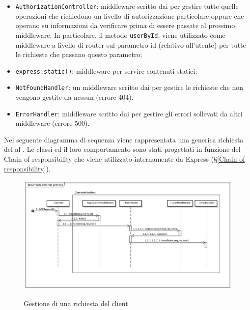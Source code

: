 \begin{itemize}
\item \texttt{AuthorizationController}: middleware scritto dai \rPs per gestire tutte quelle operazioni che richiedono un livello di autorizzazione particolare oppure che operano su informazioni da verificare prima di essere passate al prossimo middleware. In particolare, il metodo \texttt{userById}, viene utilizzato come middleware a livello di router sul parametro id (relativo all'utente) per tutte le richieste che passano questo parametro;
\item \texttt{express.static()}: middleware per servire contenuti statici;
\item \texttt{NotFoundHandler}: un middleware scritto dai \rPs per gestire le richieste che non vengono gestite da nessun  (errore  404).
\item \texttt{ErrorHandler}: middleware scritto dai \rPs per gestire gli errori sollevati da altri middleware (errore  500).
\end{itemize}
Nel seguente diagramma di sequenza viene rappresentata una generica richiesta del  al . Le classi ed il loro comportamento sono stati progettati in funzione del  Chain of responsibility che viene utilizzato internamente da Express (§\ref{Chain of responsibility}).
\begin{center}
\begin{figure}[h]
\centering
\includegraphics[scale=0.35,keepaspectratio]{diagrammi/sequenza/BackEnd/general.pdf}\label{figGeneral}
\caption{Gestione di una richiesta del client}
\end{figure}
\FloatBarrier
\end{center}
